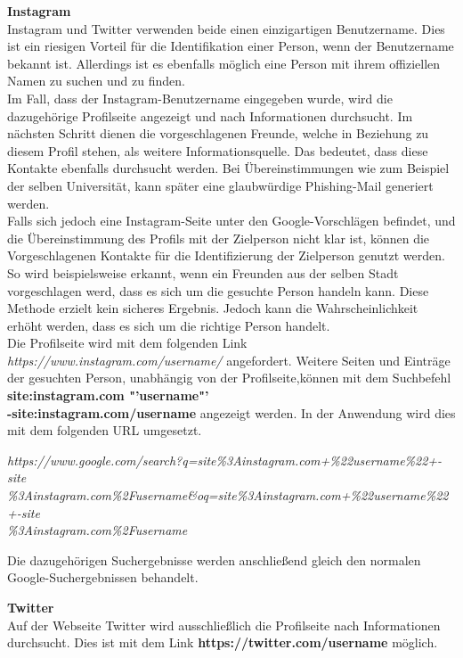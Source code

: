 			\textbf{Instagram}\\
			Instagram und Twitter verwenden beide einen einzigartigen Benutzername. Dies ist ein riesigen Vorteil für die Identifikation einer Person, wenn der Benutzername bekannt ist. Allerdings ist es ebenfalls möglich eine Person mit ihrem offiziellen Namen zu suchen und zu finden.\\
			Im Fall, dass der Instagram-Benutzername eingegeben wurde, wird die dazugehörige Profilseite angezeigt und nach Informationen durchsucht. Im nächsten Schritt dienen die vorgeschlagenen Freunde, welche in Beziehung zu diesem Profil stehen, als weitere Informationsquelle. Das bedeutet, dass diese Kontakte ebenfalls durchsucht werden. Bei Übereinstimmungen wie zum Beispiel der selben Universität, kann später eine glaubwürdige Phishing-Mail generiert werden.\\
			Falls sich jedoch eine Instagram-Seite unter den Google-Vorschlägen befindet, und die Übereinstimmung des Profils mit der Zielperson nicht klar ist, können die Vorgeschlagenen Kontakte für die Identifizierung der Zielperson genutzt werden. So wird beispielsweise erkannt, wenn ein Freunden aus der selben Stadt vorgeschlagen werd, dass es sich um die gesuchte Person handeln kann. Diese Methode erzielt kein sicheres Ergebnis. Jedoch kann die Wahrscheinlichkeit erhöht werden, dass es sich um die richtige Person handelt.\\
			Die Profilseite wird mit dem folgenden Link \textit{https://www.instagram.com/username/} angefordert. Weitere Seiten und Einträge der gesuchten Person, unabhängig von der Profilseite,können mit dem Suchbefehl \textbf{site:instagram.com "'username"' \\ -site:instagram.com/username} angezeigt werden. \cite{Bazzell} In der Anwendung wird dies mit dem folgenden URL umgesetzt.
					
			\textit{https://www.google.com/search?q=site\%3Ainstagram.com+\%22username\%22+-site\\
				\%3Ainstagram.com\%2Fusername\&oq=site\%3Ainstagram.com+\%22username\%22+-site\\
				\%3Ainstagram.com\%2Fusername}
			
			Die dazugehörigen Suchergebnisse werden anschließend gleich den normalen Google-Suchergebnissen behandelt.
			
			\textbf{Twitter}\\
			Auf der Webseite Twitter wird ausschließlich die Profilseite nach Informationen durchsucht. Dies ist mit dem Link \textbf{https://twitter.com/username} möglich.
			
